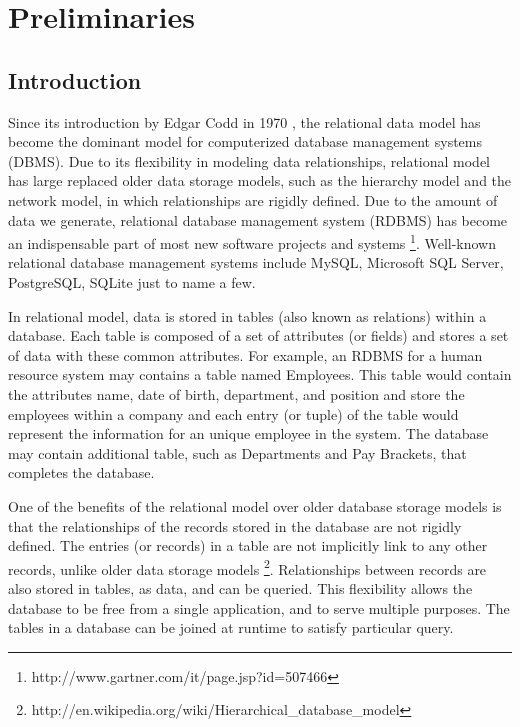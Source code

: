 \chapter{Preliminaries}

\section{Introduction}
Since its introduction by Edgar Codd in 1970 \cite{DBLP:journals/cacm/Codd70}, the relational data model has become the dominant model for computerized database management systems (DBMS). Due to its flexibility in modeling data relationships, relational model has large replaced older data storage models, such as the hierarchy model and the network model, in which relationships are rigidly defined. Due to the amount of data we generate, relational database management system (RDBMS) has become an indispensable part of most new software projects and systems \footnote{http://www.gartner.com/it/page.jsp?id=507466}. Well-known relational database management systems include MySQL, Microsoft SQL Server, PostgreSQL, SQLite just to name a few.

In relational model, data is stored in tables (also known as relations) within a database. Each table is composed of a set of attributes (or fields) and stores a set of data with these common attributes. For example, an RDBMS for a human resource system may contains a table named Employees. This table would contain the attributes name, date of birth, department, and position and store the employees within a company and each entry (or tuple) of the table would represent the information for an unique employee in the system. The database may contain additional table, such as Departments and Pay Brackets, that completes the database.

One of the benefits of the relational model over older database storage models is that the relationships of the records stored in the database are not rigidly defined. The entries (or records) in a table are not implicitly link to any other records, unlike older data storage models \footnote{http://en.wikipedia.org/wiki/Hierarchical\_database\_model}. Relationships between records are also stored in tables, as data, and can be queried. This flexibility allows the database to be free from a single application, and to serve multiple purposes. The tables in a database can be joined at runtime to satisfy particular query.

